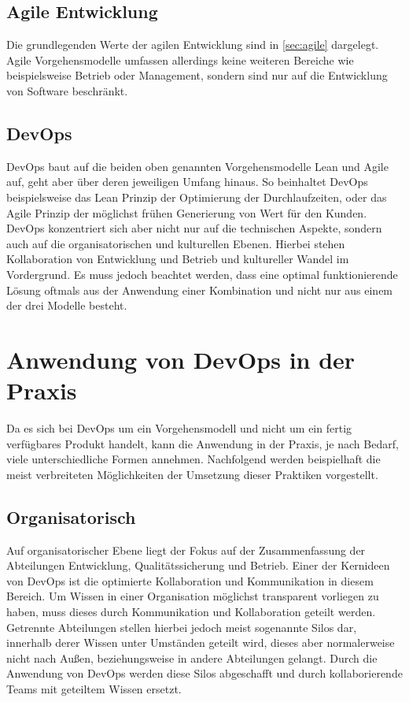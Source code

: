 \subsection{Agile Entwicklung}
Die grundlegenden Werte der agilen Entwicklung sind in \autoref{sec:agile} dargelegt.
Agile Vorgehensmodelle umfassen allerdings keine weiteren Bereiche wie beispielsweise Betrieb oder Management, sondern sind nur auf die Entwicklung von Software beschränkt.

\subsection{DevOps}
DevOps baut auf die beiden oben genannten Vorgehensmodelle Lean und Agile auf, geht aber über deren jeweiligen Umfang hinaus. 
So beinhaltet DevOps beispielsweise das Lean Prinzip der Optimierung der Durchlaufzeiten, oder das Agile Prinzip der möglichst frühen Generierung von Wert für den Kunden. 
DevOps konzentriert sich aber nicht nur auf die technischen Aspekte, sondern auch auf die organisatorischen und kulturellen Ebenen. 
Hierbei stehen Kollaboration von Entwicklung und Betrieb und kultureller Wandel im Vordergrund.
Es muss jedoch beachtet werden, dass eine optimal funktionierende Lösung oftmals aus der Anwendung einer Kombination und nicht nur aus einem der drei Modelle besteht.

\section{Anwendung von DevOps in der Praxis} \label{sec:anwendung_devops} %
Da es sich bei DevOps um ein Vorgehensmodell und nicht um ein fertig verfügbares Produkt handelt, kann die Anwendung in der Praxis, je nach Bedarf, viele unterschiedliche Formen annehmen. Nachfolgend werden beispielhaft die meist verbreiteten Möglichkeiten der Umsetzung dieser Praktiken vorgestellt.

\subsection{Organisatorisch}
Auf organisatorischer Ebene liegt der Fokus auf der Zusammenfassung der Abteilungen Entwicklung, Qualitätssicherung und Betrieb. 
Einer der Kernideen von DevOps ist die optimierte Kollaboration und Kommunikation in diesem Bereich. 
Um Wissen in einer Organisation möglichst transparent vorliegen zu haben, muss dieses durch Kommunikation und Kollaboration geteilt werden. 
Getrennte Abteilungen stellen hierbei jedoch meist sogenannte Silos dar, innerhalb derer Wissen unter Umständen geteilt wird, dieses aber normalerweise nicht nach Außen, beziehungsweise in andere Abteilungen gelangt. 
Durch die Anwendung von DevOps werden diese Silos abgeschafft und durch kollaborierende Teams mit geteiltem Wissen ersetzt. 
\parencite[Vgl.][S. 8]{huettermann:2012}

